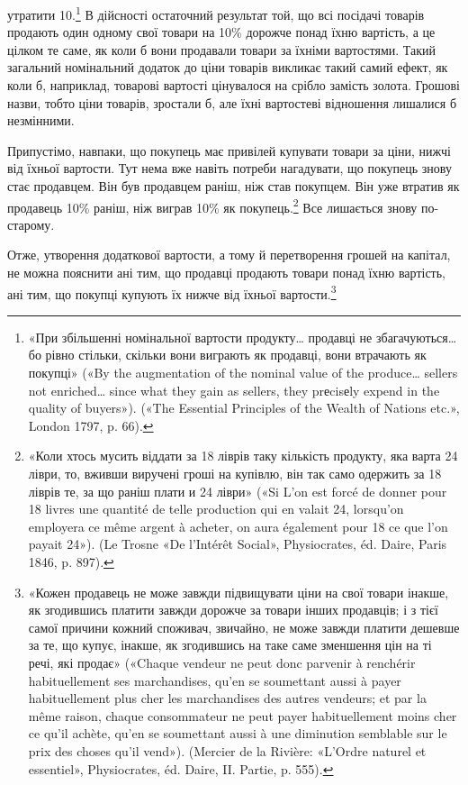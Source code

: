 \parcont{}  %
утратити 10.\footnote{
«При збільшенні номінальної вартости продукту\dots{} продавці не
збагачуються\dots{} бо рівно стільки, скільки вони виграють як продавці,
вони втрачають як покупці» («By the augmentation of the nominal value
of the produce\dots{} sellers not enriched\dots{} since what they gain as sellers, they
prеcisеly expend in the quality of buyers»). («The Essential Principles of
the Wealth of Nations etc.», London 1797, p. 66).
} В дійсності остаточний результат той, що всі посідачі
товарів продають один одному свої товари на 10\% дорожче
понад їхню вартість, а це цілком те саме, як коли б вони продавали
товари за їхніми вартостями. Такий загальний номінальний
додаток до ціни товарів викликає такий самий ефект, як коли б,
наприклад, товарові вартості цінувалося на срібло замість золота.
Грошові назви, тобто ціни товарів, зростали б, але їхні
вартостеві відношення лишалися б незмінними.

Припустімо, навпаки, що покупець має привілей купувати
товари за ціни, нижчі від їхньої вартости. Тут нема вже навіть
потреби нагадувати, що покупець знову стає продавцем. Він
був продавцем раніш, ніж став покупцем. Він уже втратив як
продавець 10\% раніш, ніж виграв 10\% як покупець.\footnote{
«Коли хтось мусить віддати за 18 ліврів таку кількість продукту,
яка варта 24 ліври, то, вживши виручені гроші на купівлю, він так само
одержить за 18 ліврів те, за що раніш плати и 24 ліври» («Si L’on est
forcé de donner pour 18 livres une quantité de telle production qui en valait
24, lorsqu’on employera ce même argent à acheter, on aura également pour
18 ce que l’on payait 24»). (Le Trosne «De l’Intérêt Social»,
Physiocrates, éd. Daire, Paris 1846, p. 897).
}  Все лишається
знову по-старому.

Отже, утворення додаткової вартости, а тому й перетворення
грошей на капітал, не можна пояснити ані тим, що продавці
продають товари понад їхню вартість, ані тим, що покупці купують
їх нижче від їхньої вартости.\footnote{
«Кожен продавець не може завжди підвищувати ціни на свої товари
інакше, як згодившись платити завжди дорожче за товари інших продавців;
і з тієї самої причини кожний споживач, звичайно, не може завжди
платити дешевше за те, що купує, інакше, як згодившись на таке саме зменшення
цін на ті речі, які продає» («Chaque vendeur ne peut donc parvenir
à renchérir habituellement ses marchandises, qu’en se soumettant aussi à
payer habituellement plus cher les marchandises des autres vendeurs; et
par la même raison, chaque consommateur ne peut payer habituellement
moins cher ce qu’il achète, qu’en se soumettant aussi à une diminution
semblable sur le prix des choses qu’il vend»). (Mercier de la Rivière:
«L’Ordre naturel et essentiel», Physiocrates, éd. Daire, II. Partie, p. 555).
}

